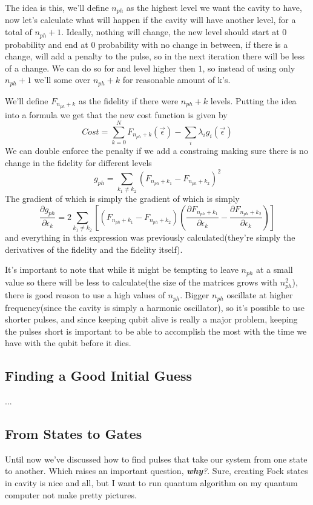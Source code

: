 \documentclass[english, a4paper, 12pt, twoside]{article}
\numberwithin{equation}{section} %
\begin{document}
The idea is this, we'll define $n_{ph}$ as the highest level we want the cavity to have, now let's calculate what will happen if the cavity will have another level, for a total of $n_{ph} + 1$. Ideally, nothing will change, the new level should start at 0 probability and end at 0 probability with no change in between, if there is a change, will add a penalty to the pulse, so in the next iteration there will be less of a change. We can do so for and level higher then $1$, so instead of using only $n_{ph} + 1$ we'll some over $n_{ph} + k$ for reasonable amount of k's.

We'll define $F_{n_{ph} + k}$ as the fidelity if there were $n_{ph} + k$ levels. Putting the idea into a formula we get that the new cost function is given by
\[
    Cost = \sum_{k=0}^{N} F_{n_{ph} + k} (\vec{\epsilon}) - \sum_i \lambda_i g_i (\vec{\epsilon})
\]
We can double enforce the penalty if we add a constraing making sure there is no change in the fidelity for different levels
\[
    g_{ph} = \sum_{k_1 \ne k_2} (F_{n_{ph} + k_1} - F_{n_{ph} + k_2})^2
\]
The gradient of which is simply the gradient of which is simply
\[
    \frac{\partial g_{ph}}{\partial \epsilon_k} = 2 \sum_{k_1 \ne k_2} [(F_{n_{ph} + k_1} - F_{n_{ph} + k_2})(\frac{\partial F_{n_{ph} + k_1}}{\partial \epsilon_k} - \frac{\partial F_{n_{ph} + k_2}}{\partial \epsilon_k})]
\]
and everything in this expression was previously calculated(they're simply the derivatives of the fidelity and the fidelity itself).

It's important to note that while it might be tempting to leave $n_{ph}$ at a small value so there will be less to calculate(the size of the matrices grows with $n_{ph}^2$), there is good reason to use a high values of $n_{ph}$. Bigger $n_{ph}$ oscillate at higher frequency(since the cavity is simply a harmonic oscillator), so it's possible to use shorter pulses, and since keeping qubit alive is really a major problem, keeping the pulses short is important to be able to accomplish the most with the time we have with the qubit before it dies.

\subsection{Finding a Good Initial Guess}
...

\subsection{From States to Gates}
Until now we've discussed how to find pulses that take our system from one state to another. Which raises an important question, \textit{\textbf{why}?}. Sure, creating Fock states in cavity is nice and all, but I want to run quantum algorithm on my quantum computer not make pretty pictures.
\end{document}
